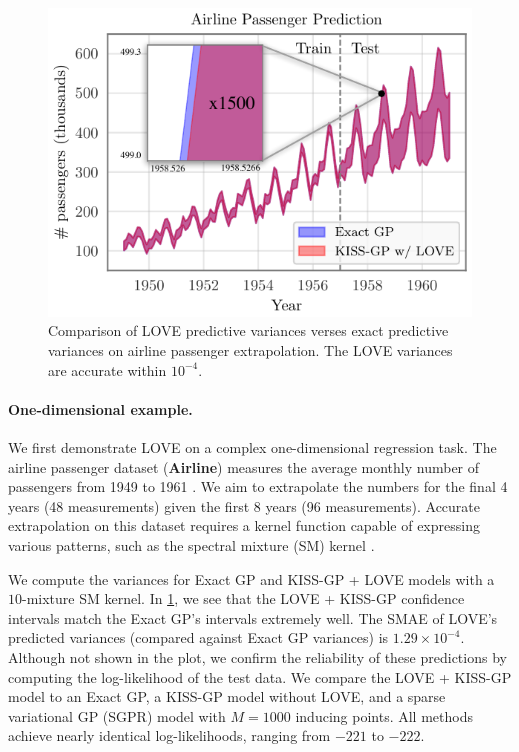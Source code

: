 \begin{figure}[t!]
  \centering
  \includegraphics[width=0.65\columnwidth]{figures/airline_comparison.pdf}
  \caption[Comparison of LOVE predictive variances verses exact predictive variances on airline passenger extrapolation.]{
    Comparison of LOVE predictive variances verses exact predictive variances on airline passenger extrapolation.
    The LOVE{} variances are accurate within $10^{-4}$.
    \label{fig:airline_results}
  }
\end{figure}

\paragraph{One-dimensional example.}
We first demonstrate LOVE{} on a complex one-dimensional regression task.
The airline passenger dataset ({\bf Airline}) measures the average monthly number of passengers from 1949 to 1961 \cite{hyndman2005time}.
We aim to extrapolate the numbers for the final 4 years (48 measurements) given the first 8 years (96 measurements).
Accurate extrapolation on this dataset requires a kernel function capable of expressing various patterns, such as the spectral mixture (SM) kernel \cite{wilson2013gaussian}.

We compute the variances for Exact GP and KISS-GP + LOVE{} models with a $10$-mixture SM kernel.
In \cref{fig:airline_results}, we see that the LOVE + KISS-GP{} confidence intervals match the Exact GP's intervals extremely well.
The SMAE of LOVE{}'s predicted variances (compared against Exact GP variances) is $1.29 \times 10^{-4}$.
Although not shown in the plot, we confirm the reliability of these predictions by computing the log-likelihood of the test data.
We compare the LOVE + KISS-GP{} model to an Exact GP, a KISS-GP model without LOVE{}, and a sparse variational GP (SGPR) model with $M=1000$ inducing points.
All methods achieve nearly identical log-likelihoods, ranging from $-221$ to $-222$.


